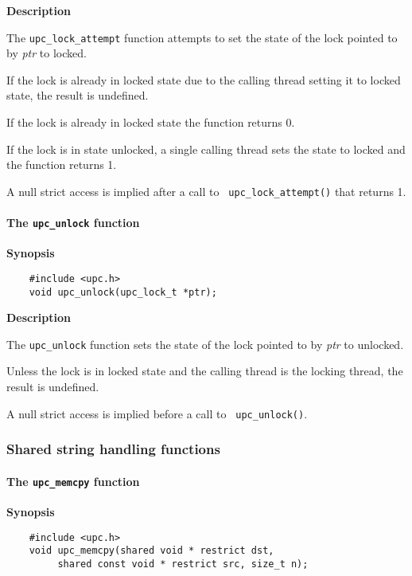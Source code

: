 {\bf Description}

\np The {\tt upc\_lock\_attempt} function attempts to set the state of
   the lock pointed to by {\em ptr} to locked.

\np If the lock is already in locked state due to the calling thread setting it
    to locked state, the result is undefined.

\np If the lock is already in locked state the function returns 0.
    
\np If the lock is in state unlocked, a single calling thread
    sets the state to locked and the function returns 1.

\np A null strict access is implied after a call to {\tt
    upc\_lock\_attempt()} that returns 1.

\paragraph{The {\tt upc\_unlock} function}

{\bf Synopsis} 

\npf\vspace{-2.5em}
\begin{verbatim}
    #include <upc.h> 
    void upc_unlock(upc_lock_t *ptr); 
\end{verbatim}

{\bf Description}

\np The {\tt upc\_unlock} function sets the state of
   the lock pointed to by {\em ptr} to unlocked.

\np Unless the lock is in locked state and the calling
    thread is the locking thread, the result is undefined.

\np A null strict access is implied before a call to {\tt
    upc\_unlock()}.

\subsubsection{Shared string handling functions}

\paragraph{The {\tt upc\_memcpy} function}

{\bf Synopsis} 

\npf\vspace{-2.5em}
\begin{verbatim}
    #include <upc.h> 
    void upc_memcpy(shared void * restrict dst, 
         shared const void * restrict src, size_t n); 
\end{verbatim}

